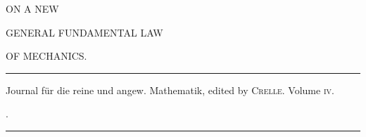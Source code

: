 \clearpage
\thispagestyle{empty}
\begin{center}
\vspace*{1.2in}
{\large ON A NEW\par}
\bigskip
{\Large GENERAL FUNDAMENTAL LAW\par}
\bigskip
{\Large OF MECHANICS.\par}
\vfill
\rule{.8\textwidth}{.3pt}\par
\medskip
{\small Journal für die reine und angew. Mathematik, edited by \textsc{Crelle}. Volume \textsc{iv}.\par}
.\par
\medskip
\rule{.8\textwidth}{.3pt}\par
\end{center}
\clearpage
